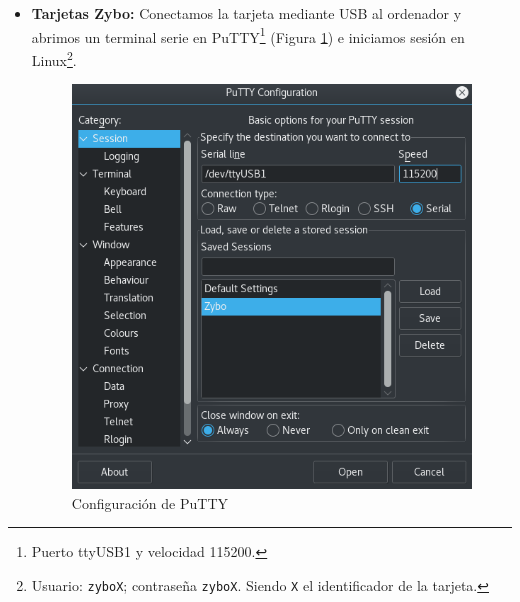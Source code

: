 \begin{itemize}
	Una vez identificada la interfaz, debemos acceder al fichero\\ \texttt{/etc/network/interfaces.d/INTERFAZ}\footnote{Siendo \texttt{INTERFAZ}, la interfaz que estamos usando. En este ejemplo, \texttt{enp5s0}.} como super-usuario con el siguiente comando:
	\begin{center}
		\texttt{gedit /etc/network/interfaces.d/enp5s0}
	\end{center}
	Y lo modificamos de la siguiente forma:
	\begin{lstlisting}
	allow-hotplug enp5s0
	    iface enp5s0 inet static
	    address 192.168.1.10
	    netmask 255.255.255.0
	    gateway 192.168.1.1
	\end{lstlisting}
	
	\newpage
	\item \textbf{Tarjetas Zybo:} Conectamos la tarjeta mediante USB al ordenador y abrimos un terminal serie en PuTTY\footnote{Puerto ttyUSB1 y velocidad 115200.} (Figura \ref{Configuración de PuTTY}) e iniciamos sesión en Linux\footnote{Usuario: \texttt{zyboX}; contraseña \texttt{zyboX}. Siendo \texttt{X} el identificador de la tarjeta.}.
	
	\begin{figure}[h]
		\centering
		\includegraphics[scale=0.7]{Anexos/Anexo2/Infraestructura/PuTTY.png}
		\caption{Configuración de PuTTY}
		\label{Configuración de PuTTY}
	\end{figure}
	

\end{itemize}
